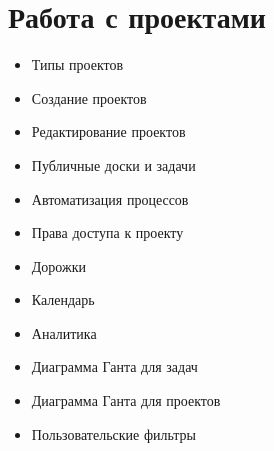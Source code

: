 \documentclass[letterpaper,10pt,russian]{sphinxmanual}
\begin{document}
\section{Работа с проектами}
\label{index:working-with-projects}\begin{itemize}
\item {} 
Типы проектов

\item {} 
Создание проектов

\item {} 
Редактирование проектов

\item {} 
Публичные доски и задачи

\item {} 
Автоматизация процессов

\item {} 
Права доступа к проекту

\item {} 
Дорожки

\item {} 
Календарь

\item {} 
Аналитика

\item {} 
Диаграмма Ганта для задач

\item {} 
Диаграмма Ганта для проектов

\item {} 
Пользовательские фильтры

\end{itemize}
\end{document}
